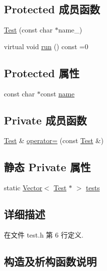 \subsection*{Protected 成员函数}
\begin{DoxyCompactItemize}
\item 
\hyperlink{classTest_a8a7783520b34172d4c6a2722c1a5c0d5}{Test} (const char $\ast$name\+\_\+)
\item 
virtual void \hyperlink{classTest_a203ca6c43b72403db54c8bdffb6efae9}{run} () const  =0
\end{DoxyCompactItemize}
\subsection*{Protected 属性}
\begin{DoxyCompactItemize}
\item 
const char $\ast$const \hyperlink{classTest_a55a121f22f5a6365a27758307c0340fa}{name}
\end{DoxyCompactItemize}
\subsection*{Private 成员函数}
\begin{DoxyCompactItemize}
\item 
\hyperlink{classTest}{Test} \& \hyperlink{classTest_a8952e21f4fe561f61fdc501a917a8aed}{operator=} (const \hyperlink{classTest}{Test} \&)
\end{DoxyCompactItemize}
\subsection*{静态 Private 属性}
\begin{DoxyCompactItemize}
\item 
static \hyperlink{classVector}{Vector}$<$ \hyperlink{classTest}{Test} $\ast$ $>$ \hyperlink{classTest_ad03939a08980e2a62dd1d1cbcb13914c}{tests}
\end{DoxyCompactItemize}


\subsection{详细描述}


在文件 test.\+h 第 6 行定义.



\subsection{构造及析构函数说明}
